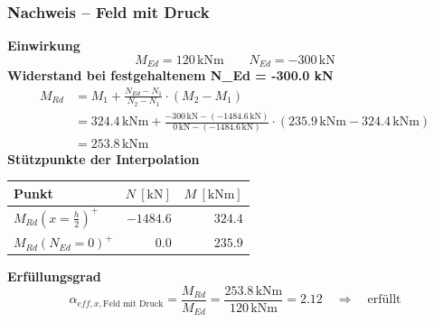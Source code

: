 \documentclass[11pt,a4paper]{article}
\begin{document}
\subsubsection{Nachweis – Feld mit Druck}
\noindent\textbf{Einwirkung}
\begin{equation*}
M_{Ed} = 120\,\mathrm{kNm} \qquad N_{Ed} = -300\,\mathrm{kN}
\end{equation*}
\noindent\textbf{Widerstand bei festgehaltenem N\_Ed = -300.0 kN}
\begin{equation*}
\begin{aligned}
  M_{Rd} &= M_1 + \frac{N_{Ed} - N_1}{N_2 - N_1} \cdot \left(M_2 - M_1\right) \\
  &= 324.4\,\mathrm{kNm} + \frac{-300\,\mathrm{kN} - \left(-1484.6\,\mathrm{kN}\right)}{0\,\mathrm{kN} - \left(-1484.6\,\mathrm{kN}\right)} \cdot \left(235.9\,\mathrm{kNm} - 324.4\,\mathrm{kNm}\right) \\
  &= 253.8\,\mathrm{kNm}
\end{aligned}
\end{equation*}
\noindent\textbf{Stützpunkte der Interpolation}
\begin{longtable}{lrr}
\hline
Punkt & $N\ [\mathrm{kN}]$ & $M\ [\mathrm{kNm}]$ \\
\hline
\endhead
$M_{Rd}(x=\tfrac{h}{2})^{+}$ & $-1484.6$ & $324.4$ \\
$M_{Rd}(N_{Ed}=0)^{+}$ & $0.0$ & $235.9$ \\
\hline
\end{longtable}
\noindent\textbf{Erfüllungsgrad}
\begin{equation*}
\alpha_{eff,x,\text{Feld mit Druck}} = \frac{M_{Rd}}{M_{Ed}} = \frac{253.8\,\mathrm{kNm}}{120\,\mathrm{kNm}} = 2.12 \quad \Rightarrow \quad \text{erfüllt}
\end{equation*}
\end{document}
